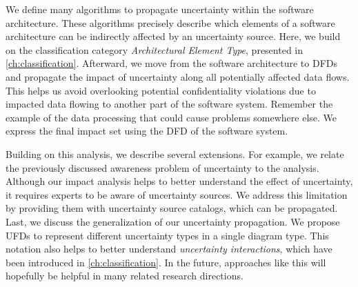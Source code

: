 We define many algorithms to propagate uncertainty within the software architecture.
These algorithms precisely describe which elements of a software architecture can be indirectly affected by an uncertainty source.
Here, we build on the classification category \emph{Architectural Element Type}, presented in \autoref{ch:classification}.
Afterward, we move from the software architecture to \acfp{DFD} and propagate the impact of uncertainty along all potentially affected data flows.
This helps us avoid overlooking potential confidentiality violations due to impacted data flowing to another part of the software system.
Remember the example of the data processing that could cause problems somewhere else.
We express the final impact set using the \ac{DFD} of the software system.

Building on this analysis, we describe several extensions.
For example, we relate the previously discussed awareness problem of uncertainty to the analysis.
Although our impact analysis helps to better understand the effect of uncertainty, it requires experts to be aware of uncertainty sources.
We address this limitation by providing them with uncertainty source catalogs, which can be propagated.
Last, we discuss the generalization of our uncertainty propagation.
We propose \acfp{UFD} to represent different uncertainty types in a single diagram type.
This notation also helps to better understand \emph{uncertainty interactions}, which have been introduced in \autoref{ch:classification}.
In the future, approaches like this will hopefully be helpful in many related research directions.
